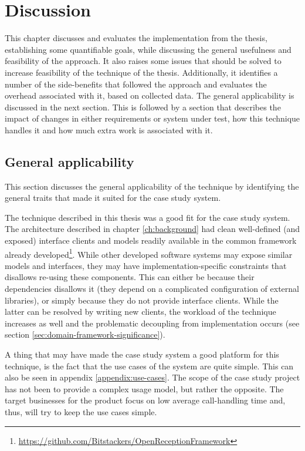 \chapter{Discussion}
This chapter discusses and evaluates the implementation from the thesis, establishing some quantifiable goals, while discussing the general usefulness and feasibility of the approach. It also raises some issues that should be solved to increase feasibility of the technique of the thesis. Additionally, it identifies a number of the side-benefits that followed the approach and evaluates the overhead associated with it, based on collected data. The general applicability is discussed in the next section. This is followed by a section that describes the impact of changes in either requirements or system under test, how this technique handles it and how much extra work is associated with it.

\section{General applicability}
This section discusses the general applicability of the technique by identifying the general traits that made it suited for the case study system.\medskip

\noindent 
The technique described in this thesis was a good fit for the case study system. The architecture described in chapter \ref{ch:background} had clean well-defined (and exposed) interface clients and models readily available in the common framework already developed\footnote{\url{https://github.com/Bitstackers/OpenReceptionFramework}}. While other developed software systems may expose similar models and interfaces, they may have implementation-specific constraints that disallows re-using these components. This can either be because their dependencies disallows it (they depend on a complicated configuration of external libraries), or simply because they do not provide interface clients. While the latter can be resolved by writing new clients, the workload of the technique increases as well and the problematic decoupling from implementation occurs (see section \ref{sec:domain-framework-significance}).

\noindent
A thing that may have made the case study system a good platform for this technique, is the fact that the use cases of the system are quite simple. This can also be seen in appendix \ref{appendix:use-cases}. The scope of the case study project has not been to provide a complex usage model, but rather the opposite. The target businesses for the product focus on low average call-handling time and, thus, will try to keep the use cases simple.\medskip


